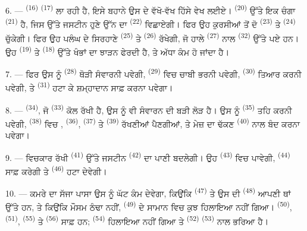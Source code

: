 6. ---  \textsuperscript{(16)} 
\textsuperscript{(17)} ਲਾ ਰਹੀ ਹੈ, ਇਸੇ ਬਹਾਨੇ ਉਸ ਦੇ ਵੱਖੋ-ਵੱਖ ਹਿੱਸੇ ਵੇਖ ਲਈਏ।
 \textsuperscript{(20)} ਉੱਤੇ ਇਕ ਚੰਗਾ 
\textsuperscript{(21)} ਹੈ, ਜਿਸ ਉੱਤੇ ਜਸਟੀਨ ਹੁਣੇ ਉੱਨ ਦਾ 
\textsuperscript{(22)} ਵਿਛਾਏਗੀ। ਫਿਰ ਉਹ ਕੁਰਸੀਆਂ ਤੋਂ ਦੋ 
\textsuperscript{(23)} ਤੇ  \textsuperscript{(24)} ਚੁੱਕੇਗੀ। ਫਿਰ ਉਹ ਪਲੰਘ
ਦੇ ਸਿਰਹਾਣੇ  \textsuperscript{(25)} ਤੇ 
\textsuperscript{(26)} ਰੱਖੇਗੀ, ਜੋ ਹਾਲੇ  \textsuperscript{(27)} ਨਾਲ
 \textsuperscript{(32)} ਉੱਤੇ ਪਏ ਹਨ। ਉਹ
 \textsuperscript{(19)} ਤੇ  \textsuperscript{(18)} ਉੱਤੇ
ਖੰਭਾਂ ਦਾ ਝਾੜਨ ਫੇਰਦੀ ਹੈ, ਤੇ ਅੱਧਾ ਕੰਮ ਹੋ ਜਾਂਦਾ ਹੈ।

7. --- ਫਿਰ ਉਸ ਨੂੰ  \textsuperscript{(28)} ਥੋੜੀ ਸੰਵਾਰਨੀ
ਪਵੇਗੀ,  \textsuperscript{(29)} ਵਿਚ ਚਾਬੀ ਭਰਨੀ ਪਵੇਗੀ,
 \textsuperscript{(30)} ਤਿਆਰ ਕਰਨੀ ਪਵੇਗੀ, ਤੇ
 \textsuperscript{(31)} ਹਟਾ ਕੇ ਸ਼ਮ੍ਹਾਦਾਨ ਸਾਫ਼ ਕਰਨਾ ਪਵੇਗਾ।

\VUsaut{5.0mm}
\VUsaut{3.0mm}

8. ---  \textsuperscript{(34)}, ਜੋ 
\textsuperscript{(33)} ਕੋਲ ਰੱਖੀ ਹੈ, ਉਸ ਨੂੰ ਵੀ ਸੰਵਾਰਨ ਦੀ ਬੜੀ ਲੋੜ ਹੈ। ਉਸ ਨੂੰ
 \textsuperscript{(35)} ਤਹਿ ਕਰਨੀ ਪਵੇਗੀ, 
\textsuperscript{(38)} ਵਿਚ ,  \textsuperscript{(36)},
 \textsuperscript{(37)} ਤੇ  \textsuperscript{(39)}
ਰੱਖਣੀਆਂ ਪੈਣਗੀਆਂ, ਤੇ ਮੇਜ਼ ਦਾ ਢੱਕਣ  \textsuperscript{(40)} ਨਾਲ ਬੰਦ ਕਰਨਾ
ਪਵੇਗਾ।

9. --- ਵਿਚਕਾਰ ਰੱਖੀ  \textsuperscript{(41)} ਉੱਤੇ ਜਸਟੀਨ
 \textsuperscript{(42)} ਦਾ ਪਾਣੀ ਬਦਲੇਗੀ। ਉਹ 
\textsuperscript{(43)} ਵਿਚ  ਪਾਵੇਗੀ, 
\textsuperscript{(44)} ਸਾਫ਼ ਕਰੇਗੀ ਤੇ 
\textsuperscript{(46)} ਹਟਾ ਦੇਵੇਗੀ।

10. --- ਕਮਰੇ ਦਾ ਸੱਜਾ ਪਾਸਾ ਉਸ ਨੂੰ ਘੱਟ ਕੰਮ ਦੇਵੇਗਾ, ਕਿਉਂਕਿ 
\textsuperscript{(47)} ਤੇ ਉਸ ਦੀ  \textsuperscript{(48)} ਆਪਣੀ ਥਾਂ ਉੱਤੇ
ਹਨ, ਤੇ ਕਿਉਂਕਿ ਮੌਸਮ ਠੰਢਾ ਨਹੀਂ,  \textsuperscript{(49)} ਦੇ ਸਾਮਾਨ
ਵਿਚ ਕੁਝ ਹਿਲਾਇਆ ਨਹੀਂ ਗਿਆ।  \textsuperscript{(50)}, 
\textsuperscript{(51)},  \textsuperscript{(55)} ਤੇ
 \textsuperscript{(56)} ਸਾਫ਼ ਹਨ; 
\textsuperscript{(54)} ਹਿਲਾਇਆ ਨਹੀਂ ਗਿਆ ਤੇ 
\textsuperscript{(52)}  \textsuperscript{(53)} ਨਾਲ ਭਰਿਆ ਹੈ।


